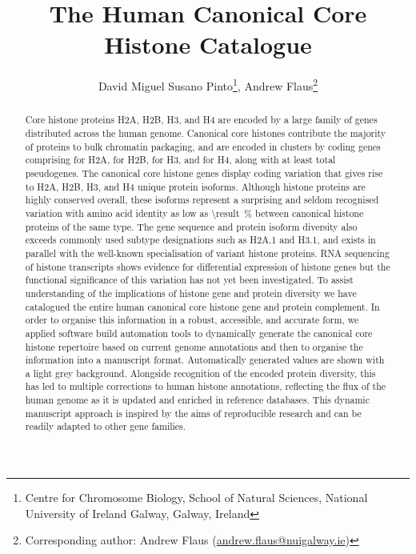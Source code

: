 \documentclass[a4paper,10pt,oneside,onecolumn,article]{memoir}
\title{The Human Canonical Core Histone Catalogue}
\author{David Miguel Susano Pinto\thanks{Centre for Chromosome
    Biology, School of Natural Sciences, National University of
    Ireland Galway, Galway, Ireland},
    Andrew Flaus\thanksmark{1}\thanks{Corresponding author: Andrew Flaus
    (\href{mailto:andrew.flaus@nuigalway.ie}{andrew.flaus@nuigalway.ie})}}
\date{}
\begin{document}
  \maketitle

  \begin{abstract}
    \noindent
    Core histone proteins H2A, H2B, H3, and H4 are encoded
    by a large family of genes distributed across the human genome.
    Canonical core histones contribute the majority of proteins to bulk chromatin packaging,
    and are encoded in \NumberOfClusters{} clusters
    by \TotalCoreCodingGenes{} coding genes comprising
    \HTwoACodingGenes{} for H2A,
    \HTwoBCodingGenes{} for H2B,
    \HThreeCodingGenes{} for H3,
    and \HFourCodingGenes{} for H4,
    along with at least \TotalCorePseudoGenes{} total pseudogenes.
    The canonical core histone genes display coding variation that gives rise to
    \HTwoAUniqueProteins{} H2A, \HTwoBUniqueProteins{} H2B,
    \HThreeUniqueProteins{} H3, and \HFourUniqueProteins{} H4 unique protein isoforms.
    Although histone proteins are highly conserved overall,
    these isoforms represent a surprising and seldom recognised variation
    with amino acid identity as low as
     \SI{\result}{\percent}
    between canonical histone proteins of the same type.
    The gene sequence and protein isoform diversity
    also exceeds commonly used subtype designations such as H2A.1 and H3.1,
    and exists in parallel with the well-known specialisation of variant histone proteins.
    RNA sequencing of histone transcripts shows evidence for
    differential expression of histone genes
    but the functional significance of this variation has not yet been investigated.
    To assist understanding of the implications of histone gene and protein diversity
    we have catalogued the entire human canonical core
    histone gene and protein complement.
    In order to organise this information in a
    robust, accessible, and accurate form,
    we applied software build automation tools to
    dynamically generate the canonical core histone repertoire
    based on current genome annotations
    and then to organise the information into a manuscript format.
    Automatically generated values are shown with a light grey background.
    Alongside recognition of the encoded protein diversity,
    this has led to multiple corrections to human histone annotations,
    reflecting the flux of the human genome as it is updated and
    enriched in reference databases.
    This dynamic manuscript approach is inspired by the aims of reproducible research
    and can be readily adapted to other gene families.
  \end{abstract}
\end{document}
